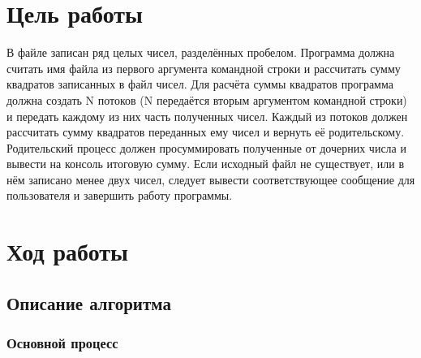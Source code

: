 \section{Цель работы}
В файле записан ряд целых чисел, разделённых пробелом. Программа должна считать имя файла из первого аргумента командной строки и рассчитать сумму квадратов записанных в файл чисел. Для расчёта суммы квадратов программа должна создать N потоков (N передаётся вторым аргументом командной строки) и передать каждому из них часть полученных чисел. Каждый из потоков должен рассчитать сумму квадратов переданных ему чисел и вернуть её родительскому. Родительский процесс должен просуммировать полученные от дочерних числа и вывести на консоль итоговую сумму. Если исходный файл не существует, или в нём записано менее двух чисел, следует вывести соответствующее сообщение для пользователя и завершить работу программы. 


\section{Ход работы}

\subsection{Описание алгоритма}
\subsubsection{Основной процесс}

